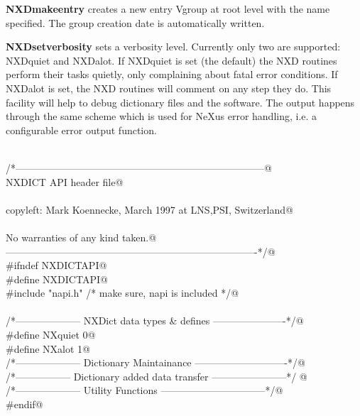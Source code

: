 \documentclass[12pt]{article}
\begin{document}
 {\bf NXDmakeentry} creates a new entry Vgroup at root level with the
  name specified. The group creation date is automatically written.

  {\bf NXDsetverbosity} sets a verbosity level. Currently only two are
  supported: NXDquiet and NXDalot. If NXDquiet is set (the default) the
  NXD routines perform their tasks quietly, only complaining about
  fatal error conditions. If NXDalot is set, the NXD routines will comment
  on any step they do. This facility will help to debug dictionary files
  and the software. The output happens through the same scheme which
  is used for NeXus error handling, i.e. a configurable error output
  function. 

\begin{flushleft} \small
\begin{minipage}{\linewidth} \label{scrap5}
\vspace{-1ex}
\begin{list}{}{} \item
\mbox{}\verb@@\\
\mbox{}\verb@/*---------------------------------------------------------------------------@\\
\mbox{}\verb@                            NXDICT API header file@\\
\mbox{}\verb@@\\
\mbox{}\verb@   copyleft: Mark Koennecke, March 1997 at LNS,PSI, Switzerland@\\
\mbox{}\verb@@\\
\mbox{}\verb@   No warranties of any kind taken.@\\
\mbox{}\verb@----------------------------------------------------------------------------*/@\\
\mbox{}\verb@#ifndef NXDICTAPI@\\
\mbox{}\verb@#define NXDICTAPI@\\
\mbox{}\verb@#include "napi.h" /* make sure, napi is included */@\\
\mbox{}\verb@@\\
\mbox{}\verb@/*-------------------- NXDict data types & defines ----------------------*/@\\
\mbox{}\verb@#define NXquiet 0@\\
\mbox{}\verb@#define NXalot  1@\\
\mbox{}\verb@/*-------------------- Dictionary Maintainance ----------------------------*/@\\
\mbox{}\verb@/*----------------- Dictionary added data transfer -----------------------*/ @\\
\mbox{}\verb@/*-------------------- Utility Functions --------------------------------*/@\\
\mbox{}\verb@#endif@\\
\end{list}
\vspace{-2ex}
\end{minipage}\\[4ex]
\end{flushleft}
\end{document}
